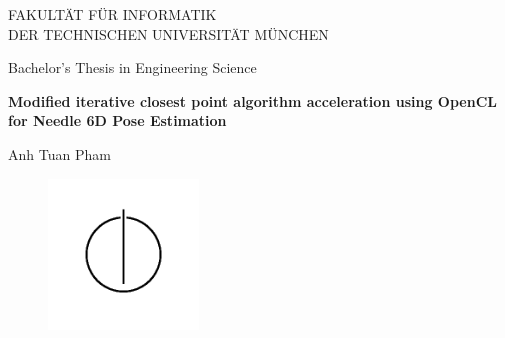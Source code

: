 \thispagestyle{empty}

\vspace{4cm}
\begin{center}
  \oTUM{4cm}

  \vspace{5mm}
  \huge FAKULT{\"A}T F{\"U}R INFORMATIK\\
  \vspace{0.5cm}
  \large DER TECHNISCHEN UNIVERSIT{\"A}T M{\"U}NCHEN\\
  \vspace{1mm}

\end{center}


\vspace{15mm}
\begin{center}

  {\Large Bachelor's Thesis in Engineering Science}

  \vspace{20mm}

  {\huge\textbf{Modified iterative closest point algorithm acceleration using OpenCL for Needle 6D Pose Estimation}}\\%


  \vspace{15mm}


  {\LARGE  Anh Tuan Pham}


  \vspace{5mm}
  


  \begin{figure}[h!]
    \centering
    \includegraphics[width=4cm]{styles/informat.png}
  \end{figure}


\end{center}